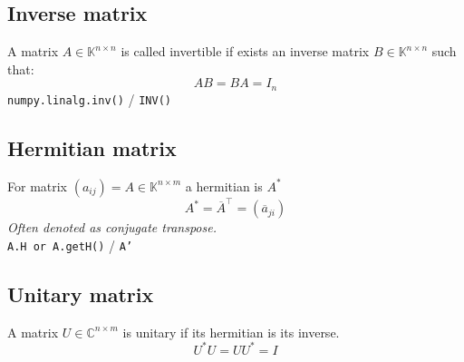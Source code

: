\subsection{Inverse matrix}
A matrix $A \in \mathbb{K}^{n \times n}$ is called invertible if exists an inverse matrix  $B \in \mathbb{K}^{n \times n}$ such that:
$$AB = BA = I_n$$
\texttt{numpy.linalg.inv()} / \texttt{INV()}

\subsection{Hermitian matrix}
For matrix $(a_{ij}) = A \in \mathbb{K}^{n \times m}$  a hermitian is $A^*$
$$A^* = \overline{A}^\top = (\overline{a}_{ji})$$
\textit{Often denoted as conjugate transpose.} \\ 
\texttt{A.H or A.getH()} / \texttt{A'}

\subsection{Unitary matrix}
A matrix $U \in \mathbb{C}^{n \times m}$ is unitary if its hermitian is its inverse.
$$U^*U = UU^* = I$$